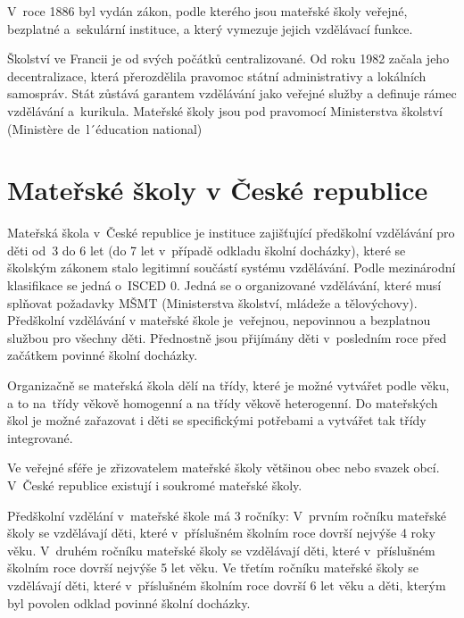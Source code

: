 		V roce 1886 byl vydán zákon, podle kterého jsou mateřské školy veřejné, bezplatné a sekulární instituce, a který vymezuje jejich vzdělávací funkce. 

		Školství ve Francii je od svých počátků centralizované. Od roku 1982 začala jeho decentralizace, která přerozdělila pravomoc státní administrativy a lokálních samospráv. Stát zůstává garantem vzdělávání jako veřejné služby a definuje rámec vzdělávání a kurikula. Mateřské školy jsou pod pravomocí Ministerstva školství (Ministère de l´éducation national)

	\section{Mateřské školy v České republice}
		Mateřská škola v České republice je instituce zajišťující předškolní vzdělávání pro děti od 3 do 6 let (do 7 let v případě odkladu školní docházky), které se školským zákonem stalo legitimní součástí systému vzdělávání. Podle mezinárodní klasifikace se jedná o ISCED 0. Jedná se o organizované vzdělávání, které musí splňovat požadavky MŠMT (Ministerstva školství, mládeže a tělovýchovy). Předškolní vzdělávání v mateřské škole je veřejnou, nepovinnou a bezplatnou službou pro všechny děti. Přednostně jsou přijímány děti v posledním roce před začátkem povinné školní docházky. 

		Organizačně se mateřská škola dělí na třídy, které je možné vytvářet podle věku, a to na třídy věkově homogenní a na třídy věkově heterogenní. Do mateřských škol je možné zařazovat i děti se specifickými potřebami a vytvářet tak třídy integrované. 

		Ve veřejné sféře je zřizovatelem mateřské školy většinou obec nebo svazek obcí. V České republice existují i soukromé mateřské školy.

		Předškolní vzdělání v mateřské škole má 3 ročníky:
		V prvním ročníku mateřské školy se vzdělávají děti, které v příslušném školním roce dovrší nejvýše 4 roky věku.
		V druhém ročníku mateřské školy se vzdělávají děti, které v příslušném školním roce dovrší nejvýše 5 let věku.
		Ve třetím ročníku mateřské školy se vzdělávají děti, které v příslušném školním roce dovrší 6 let věku a děti, kterým byl povolen odklad povinné školní docházky. 

